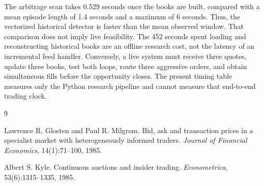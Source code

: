 \documentclass[11pt]{article}
\begin{document}
The arbitrage scan takes 0.529 seconds once the books are built, compared with a mean episode length of 1.4 seconds and a maximum of 6 seconds. Thus, the vectorized historical detector is faster than the mean observed window. That comparison does not imply live feasibility. The 452 seconds spent loading and reconstructing historical books are an offline research cost, not the latency of an incremental feed handler. Conversely, a live system must receive three quotes, update three books, test both loops, route three aggressive orders, and obtain simultaneous fills before the opportunity closes. The present timing table measures only the Python research pipeline and cannot measure that end-to-end trading clock.

\begin{thebibliography}{9}

Lawrence R. Glosten and Paul R. Milgrom.
\newblock Bid, ask and transaction prices in a specialist market with heterogeneously informed traders.
\newblock \emph{Journal of Financial Economics}, 14(1):71--100, 1985.

Albert S. Kyle.
\newblock Continuous auctions and insider trading.
\newblock \emph{Econometrica}, 53(6):1315--1335, 1985.

\end{thebibliography}
\end{document}
